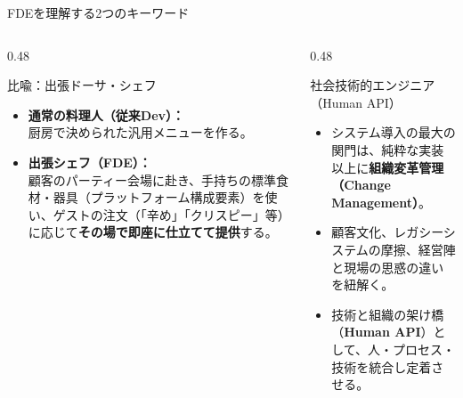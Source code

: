 \documentclass[aspectratio=169,11pt]{beamer}
\begin{document}
\begin{frame}{FDEを理解する2つのキーワード}
  \begin{columns}[T]
    \begin{column}{0.48\textwidth}
      \begin{exampleblock}{比喩：出張ドーサ・シェフ}
        \small
        \begin{itemize}
          \item \textbf{通常の料理人（従来Dev）：}\\
            厨房で決められた汎用メニューを作る。
          \item \textbf{出張シェフ（FDE）：}\\
            顧客のパーティー会場に赴き、手持ちの標準食材・器具（プラットフォーム構成要素）を使い、ゲストの注文（「辛め」「クリスピー」等）に応じて\textbf{その場で即座に仕立てて提供}する。
        \end{itemize}
      \end{exampleblock}
    \end{column}
    \begin{column}{0.48\textwidth}
      \begin{block}{社会技術的エンジニア（Human API）}
        \small
        \begin{itemize}
          \item システム導入の最大の関門は、純粋な実装以上に\textbf{組織変革管理（Change Management）}。
          \item 顧客文化、レガシーシステムの摩擦、経営陣と現場の思惑の違いを紐解く。
          \item 技術と組織の架け橋（\textbf{Human API}）として、人・プロセス・技術を統合し定着させる。
        \end{itemize}
      \end{block}
    \end{column}
  \end{columns}
\end{frame}
\end{document}
